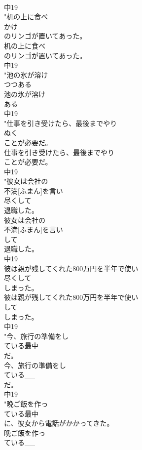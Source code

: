 \documentclass[8pt]{extreport}
\begin{document}
\begin{CJK}{UTF8}{min}
\\	中19
\\	"机の上に食べ
\\	かけ
\\	のリンゴが置いてあった。
\\	机の上に食べ
\\	のリンゴが置いてあった。
\\	中19
\\	"池の氷が溶け
\\	つつある
\\	池の氷が溶け
\\	ある
\\	中19
\\	"仕事を引き受けたら、最後までやり
\\	ぬく
\\	ことが必要だ。
\\	仕事を引き受けたら、最後までやり
\\	ことが必要だ。
\\	中19
\\	"彼女は会社の
\\	不満[ふまん]を言い
\\	尽くして
\\	退職した。
\\	彼女は会社の
\\	不満[ふまん]を言い
\\	して
\\	退職した。
\\	中19
\\	彼は親が残してくれた800万円を半年で使い
\\	尽くして
\\	しまった。
\\	彼は親が残してくれた800万円を半年で使い
\\	して
\\	しまった。
\\	中19
\\	"今、旅行の準備をし
\\	ている最中
\\	だ。
\\	今、旅行の準備をし
\\	ている__
\\	だ。
\\	中19
\\	"晩ご飯を作っ
\\	ている最中
\\	に、彼女から電話がかかってきた。
\\	晩ご飯を作っ
\\	ている__

\end{CJK}
\end{document}
